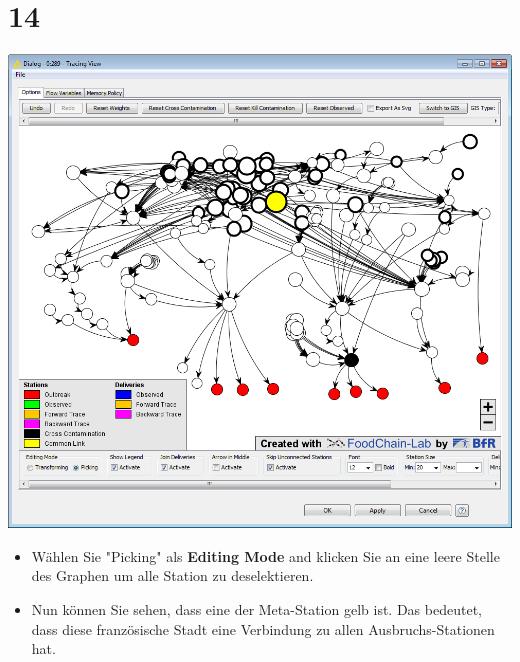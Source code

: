\documentclass{beamer}
\begin{document}
\section{14}
\begin{frame}
	\begin{center}
  		\includegraphics[height=0.6\textheight]{14.png}
	\end{center}
	\begin{itemize}
		\item Wählen Sie "Picking" als \textbf{Editing Mode} and klicken Sie an eine leere Stelle des Graphen um alle Station zu deselektieren.
		\item Nun können Sie sehen, dass eine der Meta-Station gelb ist. Das bedeutet, dass diese französische Stadt eine Verbindung zu allen Ausbruchs-Stationen hat.
	\end{itemize}
\end{frame}
\end{document}
